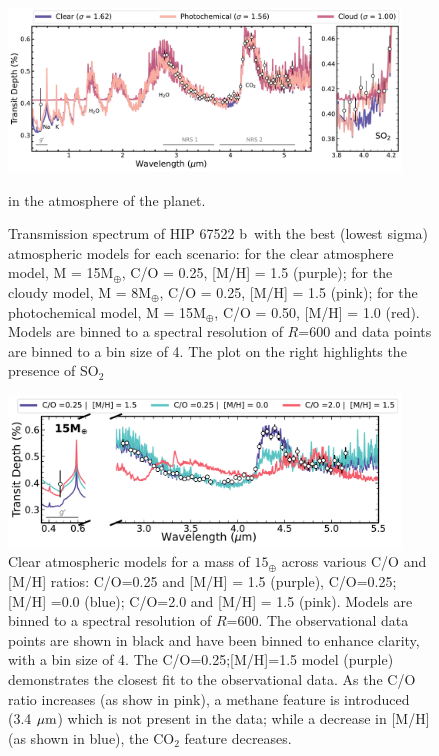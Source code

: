 \documentclass[twocolumn]{aastex63} %
\newcommand{\plname}{HIP 67522 b}
\begin{document}
\begin{figure}[]
    \centering
    \includegraphics[width=0.93\textwidth]{best_ts_models_v2.pdf}
     \caption{Transmission spectrum of \plname\, with the best (lowest sigma) atmospheric models for each scenario: for the clear atmosphere model, M = 15M$_{\oplus}$, C/O = 0.25, [M/H] = 1.5 (purple); for the cloudy model,  M = 8M$_{\oplus}$, C/O = 0.25, [M/H] = 1.5 (pink); for the photochemical model, M = 15M$_{\oplus}$, C/O = 0.50, [M/H] = 1.0 (red). Models are binned to a spectral resolution of $R$=600 and data points are binned to a bin size of 4. The plot on the right highlights the presence of SO$_{2}$} in the atmosphere of the planet.  \label{fig:best_model}
\end{figure}


\begin{figure}[]
    \centering
    \includegraphics[width=0.93\textwidth]{best_lowmet_highco_cut.pdf}
    \caption{Clear atmospheric models for a mass of $15_{\oplus}$  across various C/O and [M/H] ratios:  C/O=0.25 and [M/H] = 1.5 (purple), C/O=0.25; [M/H] =0.0 (blue);  C/O=2.0 and [M/H] = 1.5 (pink). Models are binned to a spectral resolution of $R$=600. The observational data points are shown in black and have been binned to enhance clarity, with a bin size of 4. The C/O=0.25;[M/H]=1.5 model (purple) demonstrates the closest fit to the observational data. As the C/O ratio increases (as show in pink), a methane feature is introduced (3.4 $\mbox{$\mu$m}$) which is not present in the data; while a decrease in [M/H] (as shown in blue),  the CO$_{2}$ feature decreases. }    \label{fig:best_lowmet_highco}
\end{figure}
\end{document}
